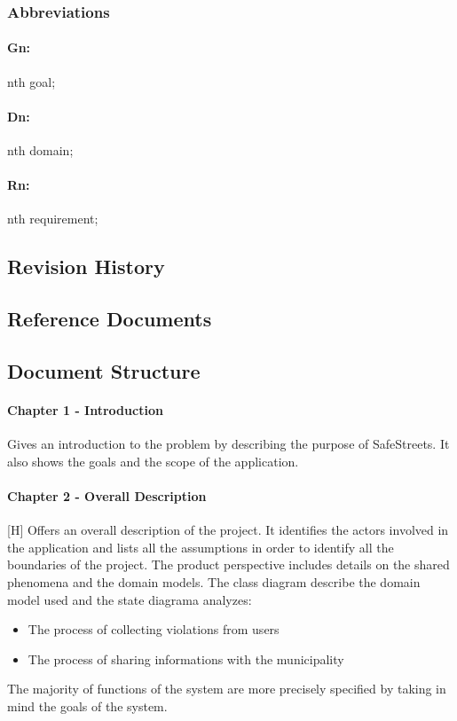 \documentclass{article}
\begin{document}
\subsubsection{Abbreviations}
\paragraph{Gn:} nth goal; \paragraph{Dn:} nth domain; \paragraph{Rn:} nth
requirement;
\subsection{Revision History}
\subsection{Reference Documents}
\subsection{Document Structure}
\paragraph{Chapter 1 - Introduction}
Gives an introduction to the problem by describing the purpose of SafeStreets.
It also shows the goals and the scope of the application. \paragraph{Chapter 2 -
Overall Description}[H] Offers an overall description of the project. It
identifies the actors involved in the application and lists all the assumptions
in order to identify all the boundaries of the project. The product perspective
includes details on the shared phenomena and the domain models. The class
diagram describe the domain model used and the state diagrama analyzes:
\begin{itemize}
    \item The process of collecting violations from users
    \item The process of sharing informations with the municipality
\end{itemize}
The majority of functions of the system are more precisely specified by taking
in mind the goals of the system.  
\end{document}
